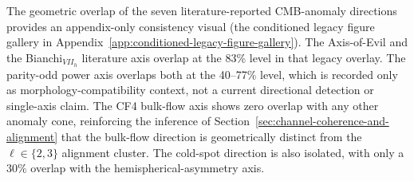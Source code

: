 The geometric overlap of the seven literature-reported
CMB-anomaly directions provides an appendix-only consistency visual
(the conditioned legacy figure gallery in Appendix~\ref{app:conditioned-legacy-figure-gallery}).  The Axis-of-Evil and the
Bianchi$_{VII_h}$ literature axis overlap at the 83\% level in that
legacy overlay.
The parity-odd power axis overlaps both at the 40--77\% level,
which is recorded only as morphology-compatibility context, not a
current directional detection or single-axis claim.  The CF4
bulk-flow axis shows zero overlap with any other anomaly cone,
reinforcing the inference of
Section~\ref{sec:channel-coherence-and-alignment} that the bulk-flow
direction is geometrically distinct from the $\ell \in \{2, 3\}$
alignment cluster.  The cold-spot direction is also isolated, with
only a 30\% overlap with the hemispherical-asymmetry axis.

